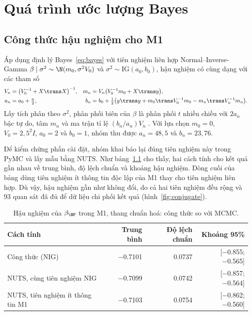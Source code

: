 \documentclass[12pt,a4paper]{report}
\begin{document}

\chapter{Quá trình ước lượng Bayes}
\label{sec:estimation}

\section{Công thức hậu nghiệm cho M1}
\label{sec:conjugate}

Áp dụng định lý Bayes~\eqref{eq:bayes} với tiên nghiệm liên hợp Normal--Inverse-Gamma $\beta \mid \sigma^2 \sim
\N(m_0, \sigma^2 V_0)$ và $\sigma^2 \sim \text{IG}(a_0, b_0)$, hậu nghiệm có cùng
dạng với các tham số
%
\begin{equation}
  \label{eq:nig}
  \begin{aligned}
    V_n &= \bigl(V_0^{-1} + X\trans X\bigr)^{-1}, &
    m_n &= V_n \bigl(V_0^{-1} m_0 + X\trans y\bigr), \\
    a_n &= a_0 + \tfrac{n}{2}, &
    b_n &= b_0 + \tfrac{1}{2}\bigl(y\trans y + m_0\trans V_0^{-1} m_0 - m_n\trans V_n^{-1} m_n\bigr).
  \end{aligned}
\end{equation}
%
Lấy tích phân theo $\sigma^2$, phân phối biên của $\beta$ là phân phối $t$ nhiều
chiều với $2a_n$ bậc tự do, tâm $m_n$ và ma trận tỉ lệ $(b_n / a_n) V_n$
\cite{gelman2013bda}. Với lựa chọn $m_0 = 0$, $V_0 = 2{,}5^2 I$, $a_0 = 2$ và
$b_0 = 1$, nhóm thu được $a_n = 48{,}5$ và $b_n = 23{,}76$.

Để kiểm chứng phần cài đặt, nhóm khai báo lại đúng tiên nghiệm này trong PyMC và
lấy mẫu bằng NUTS. Như bảng~\ref{tab:conjugate} cho thấy, hai cách tính cho kết
quả gần nhau về trung bình, độ lệch chuẩn và khoảng hậu nghiệm. Dòng cuối của bảng dùng tiên nghiệm
ít thông tin độc lập của M1 thay cho tiên nghiệm liên hợp. Dù vậy, hậu nghiệm gần
như không đổi, do cả hai tiên nghiệm đều rộng và 93 quan sát đã đủ để dữ liệu chi
phối kết quả (hình~\ref{fig:conjugate}).

\begin{table}[tp]
  \centering
  \caption{Hậu nghiệm của $\beta_{\HP}$ trong M1, thang chuẩn hoá: công thức so
    với MCMC.}
  \label{tab:conjugate}
  \begin{tabular}{lrrr}
    \toprule
    Cách tính & Trung bình & Độ lệch chuẩn & Khoảng 95\% \\
    \midrule
    Công thức (NIG)                   & \num{-0.7101} & \num{0.0737} & [\num{-0.855}; \num{-0.565}] \\
    NUTS, cùng tiên nghiệm NIG        & \num{-0.7099} & \num{0.0742} & [\num{-0.857}; \num{-0.564}] \\
    NUTS, tiên nghiệm ít thông tin M1 & \num{-0.7103} & \num{0.0754} & [\num{-0.862}; \num{-0.560}] \\
    \bottomrule
  \end{tabular}
\end{table}
\end{document}
